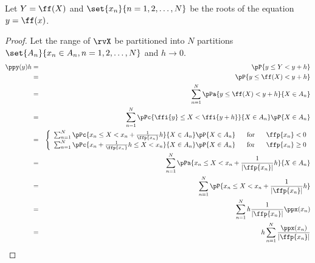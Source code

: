 \begin{theorem}
\label{thm:Y=f(X)}
Let $Y=\ff(X)$ and $\set{x_n}{n=1,2,\ldots,N}$ be the roots of the equation
$y=\ff(x)$.
\end{theorem}
\begin{proof}
Let the range of $\rvX$ be partitioned into $N$ partitions
$\set{A_n}{x_n\in A_n, n=1,2,\ldots,N}$ and $h\to0$.
\begin{eqnarray*}
  \ppy(y)h
    &=& \pP{y \le Y < y+h}
  \\&=& \pP{y \le \ff(X) < y+h}
  \\&=& \sum_{n=1}^N \pPa{y \le \ff(X) < y+h}{X\in A_n}
  \\&=& \sum_{n=1}^N \pPc{\ffi{y} \le X < \ffi{y+h}}{X\in A_n}\pP{X\in A_n}
  \\&=& \left\{\begin{array}{l@{\hspace{4ex}\mbox{for}\hspace{4ex}}l}
          \sum_{n=1}^N \pPc{x_n     \le X < x_n + \frac{1}{\ffp{x_n}}h}{X\in A_n}\pP{X\in A_n} & \ffp{x_n}<0 \\
          \sum_{n=1}^N \pPc{x_n + \frac{1}{\ffp{x_n}}h \le X < x_n}{X\in A_n}\pP{X\in A_n}     & \ffp{x_n}\ge0
        \end{array}\right.
  \\&=& \sum_{n=1}^N \pPa{x_n     \le X < x_n + \frac{1}{|\ffp{x_n}|}h}{X\in A_n}
  \\&=& \sum_{n=1}^N \pP{x_n     \le X < x_n + \frac{1}{|\ffp{x_n}|}h}
  \\&=& \sum_{n=1}^N h \frac{1}{|\ffp{x_n}|} \ppx(x_n)
  \\&=& h \sum_{n=1}^N \frac{\ppx(x_n)}{|\ffp{x_n}|}
\end{eqnarray*}
\end{proof}

